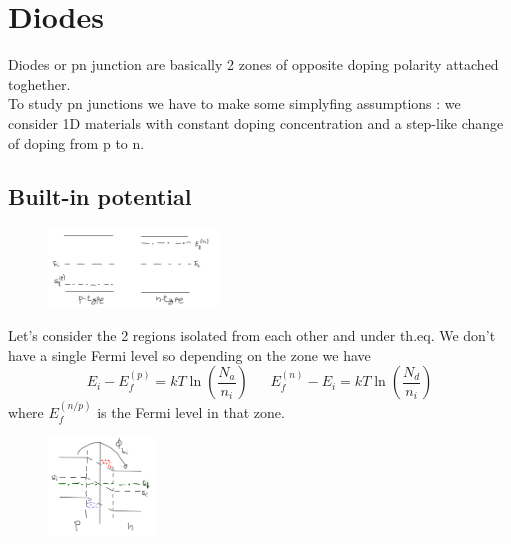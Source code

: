 \chapter{Diodes}
Diodes or pn junction are basically 2 zones of opposite doping polarity attached toghether.\\
To study pn junctions we have to make some simplyfing assumptions : we consider 1D materials with constant doping concentration and a step-like change of doping from p to n.\\
\section{Built-in potential}
\begin{figure}
\includegraphics[width=0.4\textwidth]{pn1.png}
\end{figure}


Let's consider the 2 regions isolated from each other and under th.eq. We don't have a single Fermi level so depending on the zone we have 
\begin{equation}
E_i-E_f^{(p)}=kT\ln(\frac{N_a}{n_i}) \ \ \ \ \ \ \ E_f^{(n)}-E_i=kT\ln(\frac{N_d}{n_i})
\end{equation}
where $E_f^{(n/p)}$ is the Fermi level in that zone.\\

\begin{figure}
\includegraphics[width=0.25\textwidth]{pn2.png}
\end{figure}

